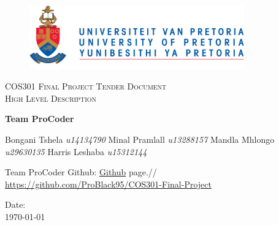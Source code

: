 \begin{titlepage}
    \begin{center}
        \begin{figure}[t]
            \centering
            \includegraphics[width=350px]{logo.PNG}
        \end{figure}
        
        \textsc{\LARGE COS301 Final Project \newline \newline Tender Document\\[0.5cm] High Level Description}
        
        \textbf{\newline Team ProCoder} \\
        \begin{flushright} \large
        Bongani Tshela \emph{u14134790} \newline
        Minal Pramlall \emph{u13288157} \newline
        Mandla Mhlongo \emph{u29630135} \newline
        Harris Leshaba \emph{u15312144} \newline
        \end{flushright}
    \vfill
    
    Team ProCoder Github: \href{https://github.com/ProBlack95/COS301-Final-Project}{Github} page.//
    \url{https://github.com/ProBlack95/COS301-Final-Project}
    
    \vfill
    {\large Date:}
    \\
    {\large \today}
    \end{center}
\end{titlepage}